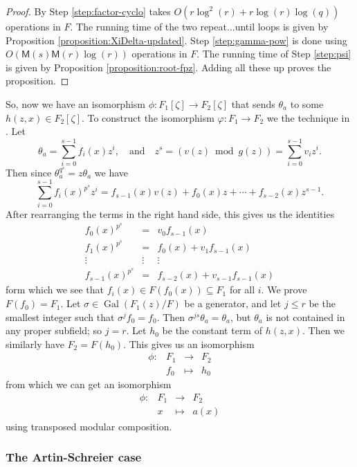 \documentclass[12pt]{article}
\theoremstyle{plain}
\theoremstyle{definition}
\DeclareMathOperator{\gal}{Gal} %
\def\MM{\ensuremath{\mathsf{M}}}
\begin{document}
\begin{proof}
	By \cite[Theorem 9]{shoup94} Step \ref{step:factor-cyclo} takes $O(r\log^2(r) + 
	r\log(r)\log(q))$ operations in $F$. The running time of the two repeat...until loops is 
	given by Proposition \ref{proposition:XiDelta-updated}. Step \ref{step:gamma-pow}
	is done using $O(\MM(s)\MM(r)\log(r))$ operations in $F$. The running time of Step 
	\ref{step:psi} is given by Proposition \ref{proposition:root-fpz}. Adding all these up proves 
	the proposition.
\end{proof}
So, now we have an isomorphism $\phi: F_1[\zeta] \rightarrow F_2[\zeta]$ that sends $\theta_a$ to 
some $h(z, x) \in F_2[\zeta]$. To construct the isomorphism $\varphi: F_1 \rightarrow F_2$ we the 
technique in \cite{Allombert02}. Let 
\[ \theta_a = \sum_{i = 0}^{s - 1}f_i(x)z^i, \quad\text{and}\quad z^s = (v(z)  \bmod g(z)) = 
\sum_{i = 0}^{s - 1}v_iz^i. \] 
Then since $\theta_a^{q^s} = z\theta_a$ we have
\[ \sum_{i = 0}^{s - 1}f_i(x)^{p^s}z^i = f_{s - 1}(x)v(z) + f_0(x)z + \cdots + f_{s - 2}(x)z^{s - 
1}.\]
After rearranging the terms in the right hand side, this gives us the identities
\[
\begin{array}{ccc}
	f_0(x)^{p^s} & = & v_0f_{s - 1}(x) \\
	f_1(x)^{p^s} & = & f_0(x) + v_1f_{s - 1}(x) \\
	\vdots & \vdots & \vdots \\
	f_{s - 1}(x)^{p^s} & = & f_{s - 2}(x) + v_{s - 1}f_{s - 1}(x)
\end{array} 
\]
form which we see that $f_i(x) \in F(f_0(x)) \subseteq F_1$ for all $i$. We prove $F(f_0) = 
F_1$. Let $\sigma \in \gal(F_1(z) / F)$ be a generator, and let $j \le r$ be the smallest 
integer such that $\sigma^jf_0 = f_0$. Then $\sigma^{js}\theta_a = \theta_a$, but $\theta_a$ is not 
contained in any proper subfield; so $j = r$. Let $h_0$ be the constant term of $h(z, x)$. Then we 
similarly have $F_2 = F(h_0)$. This gives us an isomorphism
\[
\begin{array}{rlll}
	\phi: & F_1 & \longrightarrow & F_2 \\
	& f_0 & \longmapsto & h_0
\end{array}
\]
from which we can get an isomorphism
\[
\begin{array}{rlll}
	\phi: & F_1 & \longrightarrow & F_2 \\
	& x & \longmapsto & a(x)
\end{array}
\]
using transposed modular composition.

\subsubsection{The Artin-Schreier case}
\label{sec:artin-schreier-case}
\end{document}

